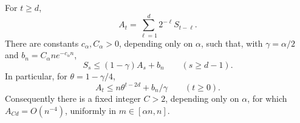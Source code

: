 \begin{proposition}
\label{prop:c-vector-domain-energy}
For $t\ge d$,
\begin{equation}
 A_t=\sum_{\ell=1}^d2^{-\ell}S_{t-\ell}.
 \label{eq:c-vector-noise-identity}
\end{equation}
There are constants $c_\alpha,C_\alpha>0$, depending only on $\alpha$,
such that, with $\gamma=\alpha/2$ and
$b_n=C_\alpha n e^{-c_\alpha n}$,
\begin{equation}
 S_s\le(1-\gamma)A_s+b_n\qquad(s\ge d-1).
 \label{eq:c-vector-singles-gain}
\end{equation}
In particular, for $\theta=1-\gamma/4$,
\begin{equation}
 A_t\le n\theta^{t-2d}+b_n/\gamma\qquad(t\ge0).
 \label{eq:c-vector-decay}
\end{equation}
Consequently there is a fixed integer $C>2$, depending only on $\alpha$,
for which $A_{Cd}=O(n^{-4})$, uniformly in $m\in[\alpha n,n]$.
\end{proposition}

